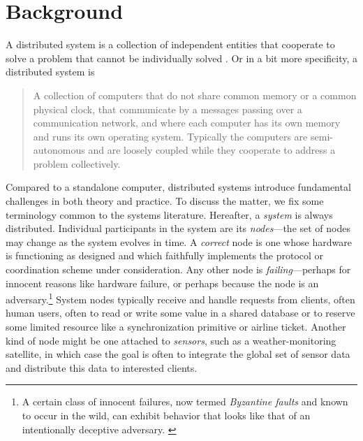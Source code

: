 \section{Background}
A distributed system is a collection of independent entities that cooperate to
solve a problem that cannot be individually solved \cite{kshemkalyani_singhal_2008}. Or in a bit more specificity, a distributed system is
\begin{quotation}
   A collection of computers that do not share common memory or a common
   physical clock, that communicate by a messages passing over a communication network, and where each computer has its own memory and runs its own operating system. Typically the computers are semi-autonomous and are loosely coupled while they cooperate to address a problem collectively. \cite{10.5555/562065}
\end{quotation}
Compared to a standalone computer, distributed systems introduce fundamental challenges in both theory and practice. To discuss the matter, we fix some terminology common to the systems literature. Hereafter, a \emph{system} is always distributed. Individual participants in the system are its \emph{nodes}---the set of nodes may change as the system evolves in time. A \emph{correct} node is one whose hardware is functioning as designed and which faithfully implements the protocol or coordination scheme under consideration. Any other node is \emph{failing}---perhaps for innocent reasons like hardware failure, or perhaps because the node is an adversary.\footnote{A certain class of innocent failures, now termed \emph{Byzantine faults} and known to occur in the wild, can exhibit behavior that looks like that of an intentionally deceptive adversary. \cite{1979Sift}} System nodes typically receive and handle requests from clients, often human users, often to read or write some value in a shared database or to reserve some limited resource like a synchronization primitive or airline ticket. Another kind of node might be one attached to \emph{sensors}, such as a weather-monitoring satellite, in which case the goal is often to integrate the global set of sensor data and distribute this data to interested clients.

